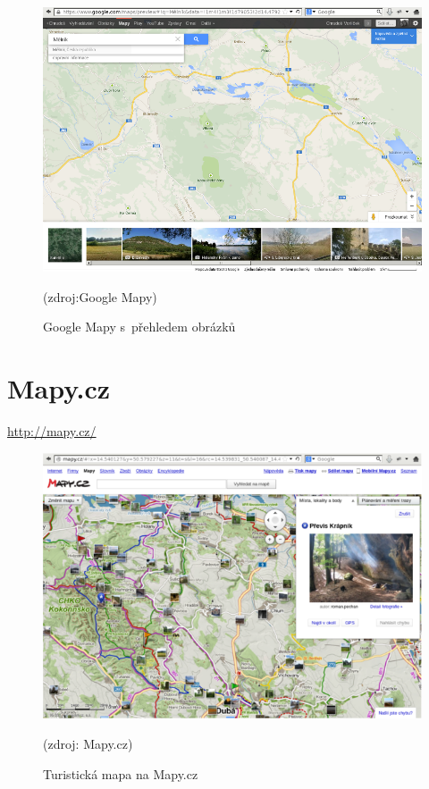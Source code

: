 \documentclass[11pt,a4paper,titlepage,oneside]{book}
\begin{document}
		\begin{figure}[!h]
			\begin{center}
				\includegraphics[width=12cm]{obrazky/googleMaps.png}
				\caption{Google Mapy s~přehledem obrázků}
				(zdroj:Google Mapy\cite{googleMap})
			\end{center}
		\end{figure}

\newpage
	\section{Mapy.cz}
		\url{http://mapy.cz/}
			\begin{figure}[!h]
				\begin{center}
					\includegraphics[width=12cm]{obrazky/mapycz.png}
					\caption{Turistická mapa na Mapy.cz}
					(zdroj: Mapy.cz\cite{seznamMapa})
				\end{center}
			\end{figure}
\end{document}
